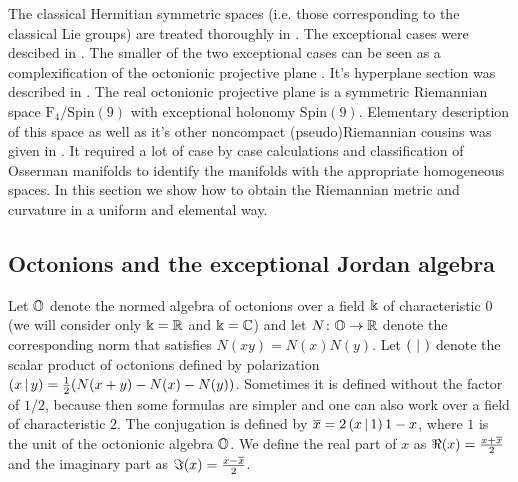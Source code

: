 The classical Hermitian symmetric spaces (i.e. those corresponding to the classical Lie groups) are treated thoroughly in \cite{faraut_analysis_1994}. The exceptional cases were descibed in \cite{drucker_exceptional_1978, drucker_simplified_1981}. The smaller of the two exceptional cases can be seen as a complexification of the octonionic projective plane \cite{landsberg_projective_2001, landsberg_projective_2003, atiyah_projective_2003}. It's hyperplane section was described in \cite{pazourek_hyperplane_2011}. The real octonionic projective plane is a symmetric Riemannian space $\mathrm{F_4}/\mathrm{Spin}(9)$ with exceptional holonomy $\mathrm{Spin}(9).$ Elementary description of this space as well as it's other noncompact (pseudo)Riemannian cousins was given in \cite{held_semi-riemannian_2009}. It required a lot of case by case calculations and classification of Osserman manifolds to identify the manifolds with the appropriate homogeneous spaces. In this section we show how to obtain the Riemannian metric and curvature in a uniform and elemental way.

\subsection{Octonions and the exceptional Jordan algebra}

Let $\mathbb{O}$ denote the normed algebra of octonions over a field $\Bbbk$ of characteristic $0$ (we will consider only $\Bbbk=\mathbb{R}$ and $\Bbbk =\mathbb{C}$) and let $N\colon\mathbb{O} \to \mathbb{R}$ denote the corresponding norm that satisfies $N(xy) = N(x)N(y)$. Let $\left( \, \,|\, \, \right)$ denote the scalar product of octonions  defined by polarization $\left( x \,|\, y \right) = \frac{1}{2} (N(x+y) - N(x) - N(y))$. Sometimes it is defined without the factor of $1/2$, because then some formulas are simpler and one can also work over a field of characteristic $2$. The conjugation is defined by $\overline{x} = 2\left( x \,|\, 1 \right)1 - x$, where $1$ is the unit of the octonionic algebra $\mathbb{O}$. We define the real part of $x$ as $\Re(x) = \frac{x + \overline{x}}{2}$ and the imaginary part as $\Im(x) = \frac{x-\overline{x}}{2}$. 

